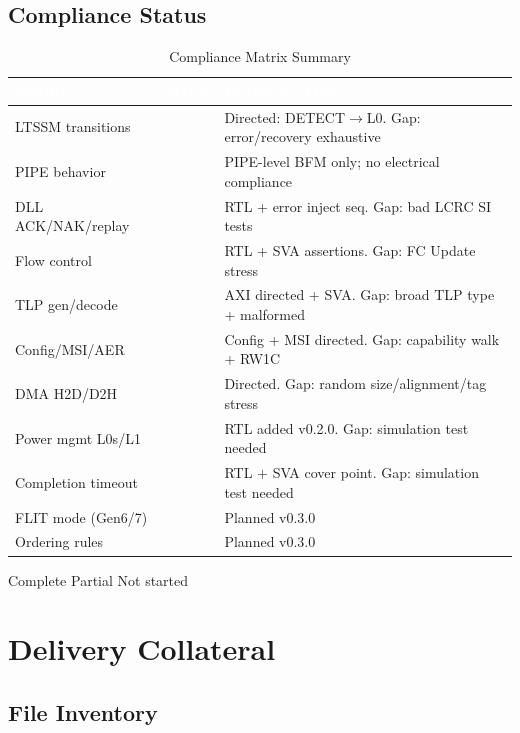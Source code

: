 \documentclass[12pt,a4paper]{report}
\newcommand{\theadcell}[1]{%
  \cellcolor{tablehead}\textcolor{white}{\textbf{#1}}}
\newcommand{\cmark}{\textcolor{scgreen}{\ding{51}}}
\newcommand{\xmark}{\textcolor{scred}{\ding{55}}}
\newcommand{\pending}{\textcolor{scorange}{\ding{117}}}
\begin{document}
\section{Compliance Status}

\begin{table}[H]
\centering
\caption{Compliance Matrix Summary}
\label{tab:compliance}
\begin{tabular}{p{4cm}lp{6.5cm}}
  \toprule
  \theadcell{Feature} & \theadcell{Status} & \theadcell{Evidence / Gap} \\
  \midrule
  LTSSM transitions  & \pending & Directed: DETECT$\to$L0. Gap: error/recovery exhaustive \\
  PIPE behavior      & \pending & PIPE-level BFM only; no electrical compliance \\
  DLL ACK/NAK/replay & \pending & RTL + error inject seq. Gap: bad LCRC SI tests \\
  Flow control       & \pending & RTL + SVA assertions. Gap: FC Update stress \\
  TLP gen/decode     & \pending & AXI directed + SVA. Gap: broad TLP type + malformed \\
  Config/MSI/AER     & \pending & Config + MSI directed. Gap: capability walk + RW1C \\
  DMA H2D/D2H        & \pending & Directed. Gap: random size/alignment/tag stress \\
  Power mgmt L0s/L1  & \pending & RTL added v0.2.0. Gap: simulation test needed \\
  Completion timeout & \pending & RTL + SVA cover point. Gap: simulation test needed \\
  FLIT mode (Gen6/7) & \xmark   & Planned v0.3.0 \\
  Ordering rules     & \xmark   & Planned v0.3.0 \\
  \bottomrule
\end{tabular}
\end{table}

\noindent\cmark{} Complete \quad \pending{} Partial \quad \xmark{} Not started

\chapter{Delivery Collateral}\label{ch:delivery}

\section{File Inventory}
\end{document}
